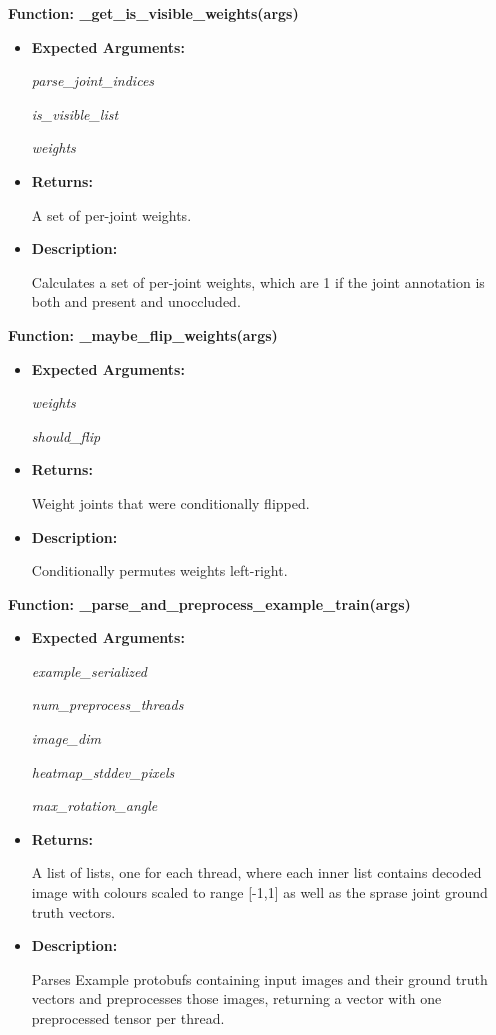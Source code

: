 \documentclass{scrreprt}
\begin{document}
\textbf{Function: \_get\_is\_visible\_weights(args)}
\begin{itemize}
    \item \textbf{Expected Arguments:}

            \quad\textit{parse\_joint\_indices}

            \quad\textit{is\_visible\_list}

            \quad\textit{weights}

    \item \textbf{Returns:}

            A set of per-joint weights.

    \item \textbf{Description:}

            Calculates a set of per-joint weights, which are 1 if the joint annotation is both and present and unoccluded.

\end{itemize}

\textbf{Function: \_maybe\_flip\_weights(args)}
\begin{itemize}
    \item \textbf{Expected Arguments:}

            \quad\textit{weights}

            \quad\textit{should\_flip}

    \item \textbf{Returns:}

            Weight joints that were conditionally flipped.

    \item \textbf{Description:}

            Conditionally permutes weights left-right.

\end{itemize}

\textbf{Function: \_parse\_and\_preprocess\_example\_train(args)}
\begin{itemize}
    \item \textbf{Expected Arguments:}

            \quad\textit{example\_serialized}

            \quad\textit{num\_preprocess\_threads}

            \quad\textit{image\_dim}

            \quad\textit{heatmap\_stddev\_pixels}

            \quad\textit{max\_rotation\_angle}

    \item \textbf{Returns:}

            A list of lists, one for each thread, where each inner list contains decoded image with colours scaled to range [-1,1] as well as the sprase joint ground truth vectors.

    \item \textbf{Description:}

            Parses Example protobufs containing input images and their ground truth vectors and preprocesses those images, returning a vector with one preprocessed tensor per thread.

\end{itemize}
\end{document}
